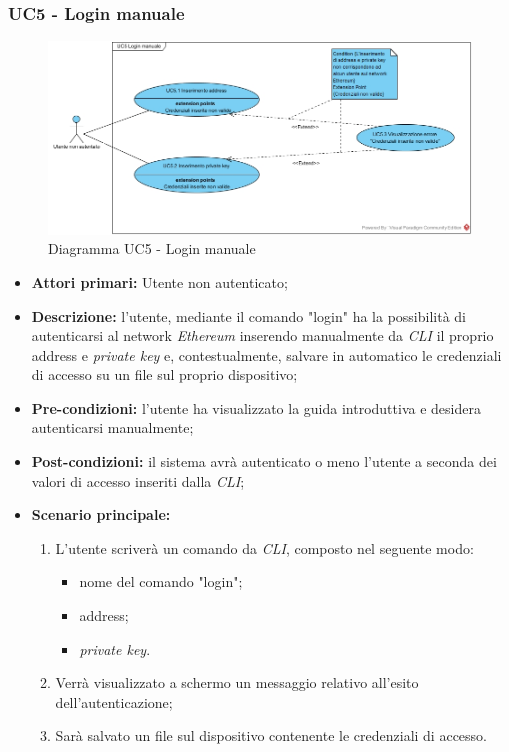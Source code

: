 \subsubsection{UC5 - Login manuale}
\begin{figure}[h]
	\centering
	\includegraphics[width=\linewidth]{res/img/UC5.jpg}
	\caption{Diagramma UC5 - Login manuale}
\end{figure}
\begin{itemize}
	\item \textbf{Attori primari:} Utente non autenticato;
	\item \textbf{Descrizione:} l'utente, mediante il comando "login" ha la possibilità di autenticarsi al network \textit{Ethereum\glo} inserendo manualmente da \textit{CLI\glo} il proprio address e \textit{private key\glos} e, contestualmente, salvare in automatico le credenziali di accesso su un file sul proprio dispositivo;
	\item \textbf{Pre-condizioni:} l'utente ha visualizzato la guida introduttiva e desidera autenticarsi manualmente;
	\item \textbf{Post-condizioni:} il sistema avrà autenticato o meno l'utente a seconda dei valori di accesso inseriti dalla \textit{CLI\glos};
	\item \textbf{Scenario principale:}
	\begin{enumerate}
		\item L'utente scriverà un comando da \textit{CLI\glos}, composto nel seguente modo:
		\begin{itemize}
			\item nome del comando "login";
			\item address;
			\item \textit{private key\glos}.
		\end{itemize}
		\item Verrà visualizzato a schermo un messaggio relativo all'esito dell'autenticazione;
		\item Sarà salvato un file sul dispositivo contenente le credenziali di accesso.
	\end{enumerate}
\end{itemize}
